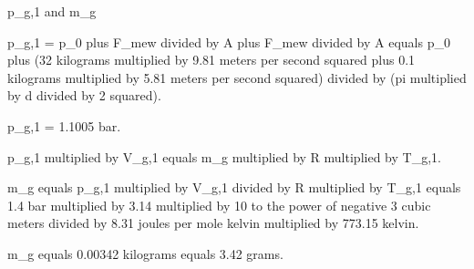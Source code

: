 p_g,1 and m_g  

p_g,1 = p_0 plus F_mew divided by A plus F_mew divided by A equals p_0 plus (32 kilograms multiplied by 9.81 meters per second squared plus 0.1 kilograms multiplied by 5.81 meters per second squared) divided by (pi multiplied by d divided by 2 squared).  

p_g,1 = 1.1005 bar.  

p_g,1 multiplied by V_g,1 equals m_g multiplied by R multiplied by T_g,1.  

m_g equals p_g,1 multiplied by V_g,1 divided by R multiplied by T_g,1 equals 1.4 bar multiplied by 3.14 multiplied by 10 to the power of negative 3 cubic meters divided by 8.31 joules per mole kelvin multiplied by 773.15 kelvin.  

m_g equals 0.00342 kilograms equals 3.42 grams.